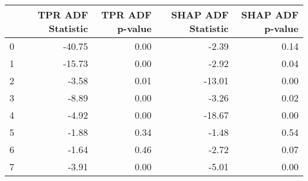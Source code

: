 \begin{tabular}{lrrrr}
\toprule
 & TPR ADF Statistic & TPR ADF p-value & SHAP ADF Statistic & SHAP ADF p-value \\
\midrule
0 & -40.75 & 0.00 & -2.39 & 0.14 \\
1 & -15.73 & 0.00 & -2.92 & 0.04 \\
2 & -3.58 & 0.01 & -13.01 & 0.00 \\
3 & -8.89 & 0.00 & -3.26 & 0.02 \\
4 & -4.92 & 0.00 & -18.67 & 0.00 \\
5 & -1.88 & 0.34 & -1.48 & 0.54 \\
6 & -1.64 & 0.46 & -2.72 & 0.07 \\
7 & -3.91 & 0.00 & -5.01 & 0.00 \\
\bottomrule
\end{tabular}
